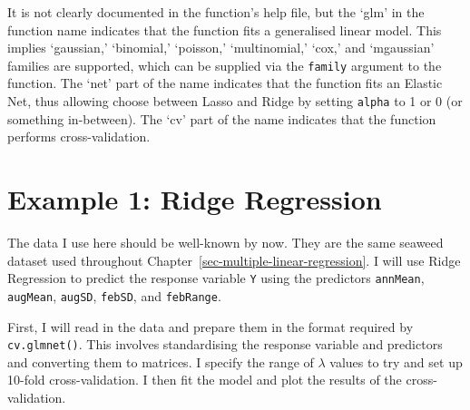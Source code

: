 \documentclass[
  letterpaper,
]{book}
\begin{document}
It is not clearly documented in the function's help file, but the `glm'
in the function name indicates that the function fits a generalised
linear model. This implies `gaussian,' `binomial,' `poisson,'
`multinomial,' `cox,' and `mgaussian' families are supported, which can
be supplied via the \texttt{family} argument to the function. The `net'
part of the name indicates that the function fits an Elastic Net, thus
allowing choose between Lasso and Ridge by setting \texttt{alpha} to 1
or 0 (or something in-between). The `cv' part of the name indicates that
the function performs cross-validation.

\section{Example 1: Ridge Regression}\label{example-1-ridge-regression}

The data I use here should be well-known by now. They are the same
seaweed dataset used throughout
Chapter~\ref{sec-multiple-linear-regression}. I will use Ridge
Regression to predict the response variable \texttt{Y} using the
predictors \texttt{annMean}, \texttt{augMean}, \texttt{augSD},
\texttt{febSD}, and \texttt{febRange}.

First, I will read in the data and prepare them in the format required
by \texttt{cv.glmnet()}. This involves standardising the response
variable and predictors and converting them to matrices. I specify the
range of \(\lambda\) values to try and set up 10-fold cross-validation.
I then fit the model and plot the results of the cross-validation.
\end{document}
